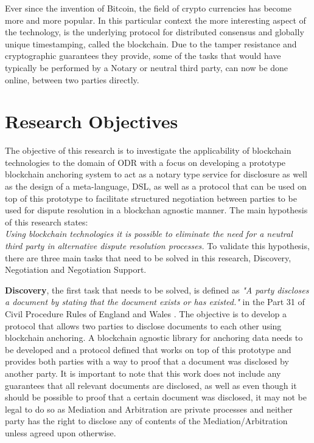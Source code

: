 \documentclass[12pt,msc,a4paper,oneside]{ucl_thesis}
\begin{document}
Ever since the invention of Bitcoin, the field of crypto currencies has become more and more popular. In this particular context the more interesting aspect of the technology, is the underlying protocol for distributed consensus and globally unique timestamping, called the blockchain. Due to the tamper resistance and cryptographic guarantees they provide, some of the tasks that would have typically be performed by a Notary or neutral third party, can now be done online, between two parties directly.


\section{Research Objectives}
The objective of this research is to investigate the applicability of blockchain technologies to the domain of ODR with a focus on developing a prototype blockchain anchoring system to act as a notary type service for disclosure as well as the design of a meta-language, DSL, as well as a protocol that can be used on top of this prototype to facilitate structured negotiation between parties to be used for dispute resolution in a blockchan agnostic manner. The main hypothesis of this research states:
\\\textit{Using blockchain technologies it is possible to eliminate the need for a neutral third party in alternative dispute resolution processes.}
To validate this hypothesis, there are three main tasks that need to be solved in this research, Discovery, Negotiation and Negotiation Support.

\textbf{Discovery}, the first task that needs to be solved, is defined as \textit{"A party discloses a document by stating that the document exists or has existed."} in the Part 31 of Civil Procedure Rules of England and Wales \cite{justice_gov:civil_procedure_rules}. The objective is to develop a protocol that allows two parties to disclose documents to each other using blockchain anchoring. A blockchain agnostic library for anchoring data needs to be developed and a protocol defined that works on top of this prototype and provides both parties with a way to proof that a document was disclosed by another party. It is important to note that this work does not include any guarantees that all relevant documents are disclosed, as well as even though it should be possible to proof that a certain document was disclosed, it may not be legal to do so as Mediation and Arbitration are private processes and neither party has the right to disclose any of contents of the Mediation/Arbitration unless agreed upon otherwise.
\end{document}
